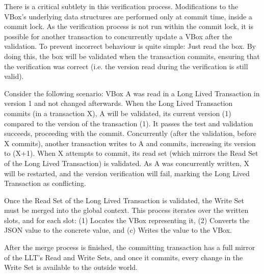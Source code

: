 There is a critical subtlety in this verification
process. Modifications to the VBox's underlying data structures are
performed only at commit time, inside a commit lock. As the
verification process is not run within the commit lock, it is possible
for another transaction to concurrently update a VBox after the
validation. To prevent incorrect behaviour is quite simple: Just read
the box. By doing this, the box will be validated when the transaction
commits, ensuring that the verification was correct (i.e. the version
read during the verification is still valid).

Consider the following scenario: VBox A was read in a Long Lived
Transaction in version 1 and not changed afterwards. When the Long
Lived Transaction commits (in a transaction X), A will be validated,
its current version (1) compared to the version of the transaction
(1). It passes the test and validation succeeds, proceeding with the
commit. Concurrently (after the validation, before X commits), another
transaction writes to A and commits, increasing its version to (X+1). When
X attempts to commit, its read set (which mirrors the Read Set of the
Long Lived Transaction) is validated. As A was concurrently written, X
will be restarted, and the version verification will fail, marking the
Long Lived Transaction as conflicting.

Once the Read Set of the Long Lived Transaction is validated, the
Write Set must be merged into the global context. This process
iterates over the written slots, and for each slot: (1) Locates the
VBox representing it, (2) Converts the JSON value to the concrete value,
and (c) Writes the value to the VBox.

After the merge process is finished, the committing transaction has a
full mirror of the LLT's Read and Write Sets, and once it commits,
every change in the Write Set is available to the outside world.

